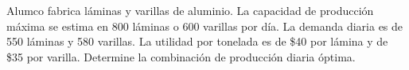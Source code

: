 \begin{frameact}{}{}
  \label{act:taha_02-02A-06}
  Alumco fabrica láminas y varillas de aluminio. La capacidad de producción máxima se estima en 800 láminas o 600 varillas por día. La demanda diaria es de 550 láminas y 580 varillas. La utilidad por tonelada es de \$40 por lámina y de \$35 por varilla. Determine la
combinación de producción diaria óptima.
\end{frameact}


